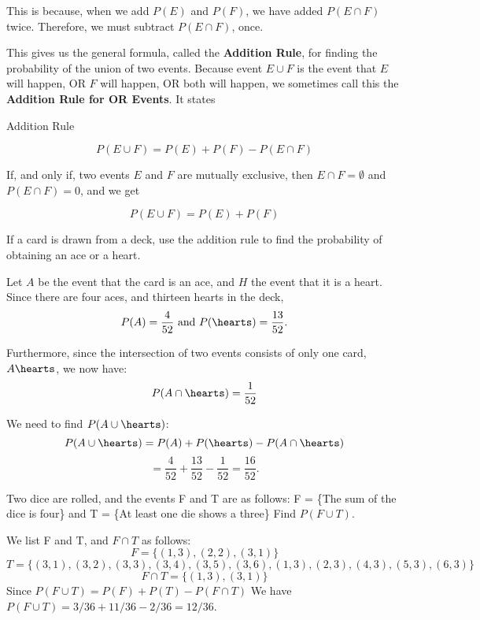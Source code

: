 This is because, when we add \( P(E) \) and \( P(F) \), we have added \( P(E \cap F) \) twice. Therefore, we must subtract \( P(E \cap F) \), once.

This gives us the general formula, called the \textbf{Addition Rule}, for finding the probability of the union of two events. Because event \( E \cup F \) is the event that \( E \) will happen, OR \( F \) will happen, OR both will happen, we sometimes call this the \textbf{Addition Rule for OR Events}. It states

\begin{summarybox}{Addition Rule}

    \[ P(E \cup F) = P(E) + P(F) - P(E \cap F) \]

    If, and only if, two events \( E \) and \( F \) are mutually exclusive, then \( E \cap F = \emptyset \) and \( P(E \cap F) = 0 \), and we get

    \[ P(E \cup F) = P(E) + P(F) \]
\end{summarybox}

\begin{example}
    If a card is drawn from a deck, use the addition rule to find the probability of obtaining an ace or a heart.
\end{example}
\begin{solution}
    Let \( A \) be the event that the card is an ace, and \( H \) the event that it is a heart.
    Since there are four aces, and thirteen hearts in the deck,
    \[ P(A) = \frac{4}{52} \text{ and } P(\hearts) = \frac{13}{52}. \]

    Furthermore, since the intersection of two events consists of only one card, \(A\hearts\), we now have:
    \[ P(A \cap \hearts) = \frac{1}{52} \]

    We need to find \( P(A \cup \hearts) \):
    \[ P(A \cup \hearts) = P(A) + P(\hearts) - P(A \cap \hearts) \]
    \[ = \frac{4}{52} + \frac{13}{52} - \frac{1}{52} = \frac{16}{52}. \]
\end{solution}


\begin{example}
    Two dice are rolled, and the events F and T are as follows:
    F = \{The sum of the dice is four\} and T = \{At least one die shows a three\}
    Find \( P(F \cup T) \).
\end{example}
\begin{solution}
    We list F and T, and \( F \cap T \) as follows:
    \[
        F = \{(1, 3), (2, 2), (3, 1)\} \]
    \[
        T = \{(3, 1), (3, 2), (3, 3), (3, 4), (3, 5), (3, 6), (1, 3), (2, 3), (4, 3), (5, 3), (6, 3)\}
    \]
    \[
        F \cap T = \{(1, 3), (3, 1)\}
    \]
    Since \( P(F \cup T) = P(F) + P(T) - P(F \cap T) \)
    We have \( P(F \cup T) = 3/36 + 11/36 - 2/36 = 12/36 \).
\end{solution}

